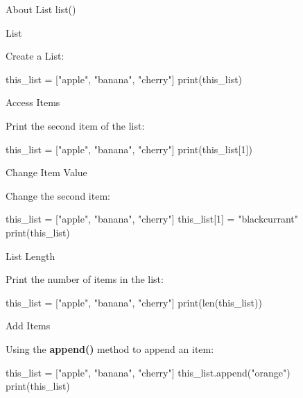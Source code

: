 \documentclass[hyperref={pdfpagelabels=false}]{beamer}
\begin{document}
\begin{frame}{About List}
\centering
\Huge{list()}
\end{frame}

\begin{frame}[fragile]{List}
\begin{exampleblock}{Create a List:}
\begin{python3}
this_list = ["apple", "banana", "cherry"]
print(this_list)
\end{python3}
\end{exampleblock}
\end{frame}

\begin{frame}[fragile]{Access Items}
\begin{exampleblock}{Print the second item of the list:}
\begin{python3}
this_list = ["apple", "banana", "cherry"]
print(this_list[1])
\end{python3}
\end{exampleblock}
\end{frame}

\begin{frame}[fragile]{Change Item Value}
\begin{exampleblock}{Change the second item:}
\begin{python3}
this_list = ["apple", "banana", "cherry"]
this_list[1] = "blackcurrant"
print(this_list)
\end{python3}
\end{exampleblock}
\end{frame}

\begin{frame}[fragile]{List Length}
\begin{exampleblock}{Print the number of items in the list:}
\begin{python3}
this_list = ["apple", "banana", "cherry"]
print(len(this_list))
\end{python3}
\end{exampleblock}
\end{frame}

\begin{frame}[fragile]{Add Items}
\begin{exampleblock}{Using the \textbf{append()} method to append an item:}
\begin{python3}
this_list = ["apple", "banana", "cherry"]
this_list.append("orange")
print(this_list)
\end{python3}
\end{exampleblock}
\end{frame}
\end{document}
